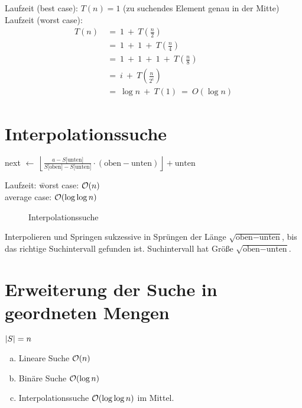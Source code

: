 \begin{enumerate}[1.]
        Laufzeit (best case): $T(n) = 1$ (zu suchendes Element genau in der Mitte)\\
        Laufzeit (worst case): 
        \begin{align*}
            T(n)~&=~1~+~T \left( \frac{n}{2} \right)\\
            &=~1~+~1~+~T \left( \frac{n}{4} \right)\\
            &=~1~+~1~+~1~+~T \left( \frac{n}{8} \right)\\
            &=~i~+~T \left( \frac{n}{2^{i}} \right)\tag{i-ter Schritt}\\
            &=~\log n~+~T(1)~=~O \left( \log n \right)
        \end{align*}
    \end{enumerate}

    \section{Interpolationssuche}

        next $\leftarrow~\left\lfloor \frac{a - S \lbrack \text{unten} \rbrack}{S \lbrack \text{oben} \rbrack - 
        S \lbrack \text{unten} \rbrack} \cdot \left( \text{oben} - \text{unten} \right)\right\rfloor + \text{unten}$\\
        \begin{tabbing}
            Laufzeit: \= worst case: $\mathcal{O}(n)$\\
            \> average case: $\mathcal{O}(\log \log n)$\\
        \end{tabbing}

        \begin{figure}
            \centering
            
            \caption{Interpolationssuche}
            \label{diag2:interpolationsearch}
        \end{figure}
        
        Interpolieren und Springen sukzessive in Sprüngen der Länge $\sqrt{\text{oben} - \text{unten}}$, bis das richtige Suchintervall gefunden ist.
        Suchintervall hat Größe $\sqrt{\text{oben} - \text{unten}}$.

    
    \section{Erweiterung der Suche in geordneten Mengen}
        $\left| S \right| = n$ \\
        \begin{enumerate}[a.)]
            \item Lineare Suche $\mathcal{O}(n)$ 
            \item Binäre Suche $\mathcal{O}(\log n)$
            \item Interpolationssuche $\mathcal{O}(\log \log n)$ im Mittel.
        \end{enumerate}
      

